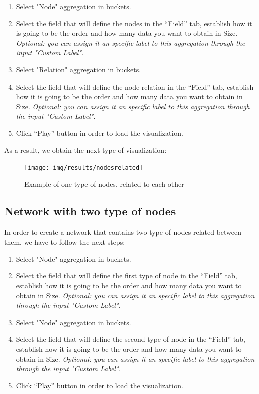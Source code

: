 \documentclass[a4paper, 12pt]{book}
\begin{document}
\begin{enumerate}
\item Select "Node" aggregation in buckets.
\item Select the field that will define the nodes in the “Field” tab, establish how it is going to be the order and how many data you want to obtain in Size. \textit{Optional: you can assign it an specific label to this aggregation through the input "Custom Label". }
\item Select "Relation" aggregation in buckets.
\item Select the field that will define the node relation in the “Field” tab, establish how it is going to be the order and how many data you want to obtain in Size. \textit{Optional: you can assign it an specific label to this aggregation through the input "Custom Label". }
\item Click “Play” button in order to load the visualization.
\end{enumerate}

As a result, we obtain the next type of visualization:

\begin{figure}[H]
  \centering
  \texttt{[image: img/results/nodesrelated]}
  \caption{Example of one type of nodes, related to each other}
  \label{fig:nodesrelated}
\end{figure}

\subsection{Network with two type of nodes}

In order to create a network that contains two type of nodes related between them, we have to follow the next steps:

\begin{enumerate}
\item Select "Node" aggregation in buckets.
\item Select the field that will define the first type of node in the “Field” tab, establish how it is going to be the order and how many data you want to obtain in Size. \textit{Optional: you can assign it an specific label to this aggregation through the input "Custom Label". }
\item Select "Node" aggregation in buckets.
\item Select the field that will define the second type of node in the “Field” tab, establish how it is going to be the order and how many data you want to obtain in Size. \textit{Optional: you can assign it an specific label to this aggregation through the input "Custom Label". }
\item Click “Play” button in order to load the visualization.
\end{enumerate}
\end{document}
